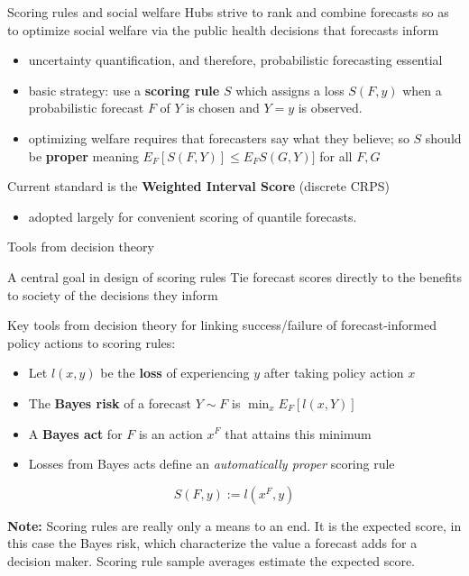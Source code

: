 \documentclass[
  9pt,
  ignorenonframetext,
]{beamer}
\providecommand{\tightlist}{%
  \setlength{\itemsep}{0pt}\setlength{\parskip}{0pt}}\usepackage{longtable,booktabs,array}
\begin{document}
\begin{frame}{Scoring rules and social welfare}
\protect\hypertarget{scoring-rules-and-social-welfare}{}
Hubs strive to rank and combine forecasts so as to optimize social
welfare via the public health decisions that forecasts inform

\begin{itemize}
\item
  uncertainty quantification, and therefore, probabilistic forecasting
  essential
\item
  basic strategy: use a \textbf{scoring rule} \(S\) which assigns a loss
  \(S(F,y)\) when a probabilistic forecast \(F\) of \(Y\) is chosen and
  \(Y=y\) is observed.
\item
  optimizing welfare requires that forecasters say what they believe; so
  \(S\) should be \textbf{proper} meaning
  \(\displaystyle{E_{F}[S(F,Y)] \leq E_{F}S(G,Y)]}\) for all \(F, G\)
\end{itemize}

Current standard is the \textbf{Weighted Interval Score} (discrete CRPS)

\begin{itemize}
\tightlist
\item
  adopted largely for convenient scoring of quantile forecasts.
\end{itemize}
\end{frame}

\begin{frame}{Tools from decision theory}
\protect\hypertarget{tools-from-decision-theory}{}
\begin{block}{A central goal in design of scoring rules}
\protect\hypertarget{a-central-goal-in-design-of-scoring-rules}{}
Tie forecast scores directly to the benefits to society of the decisions
they inform

Key tools from decision theory for linking success/failure of
forecast-informed policy actions to scoring rules:

\begin{itemize}
\item
  Let \(l(x,y)\) be the \textbf{loss} of experiencing \(y\) after taking
  policy action \(x\)
\item
  The \textbf{Bayes risk} of a forecast \(Y \sim F\) is
  \(\min_x E_F[l(x,Y)]\)
\item
  A \textbf{Bayes act} for \(F\) is an action \(x^F\) that attains this
  minimum
\item
  Losses from Bayes acts define an \emph{automatically proper} scoring
  rule
\end{itemize}

\[
S(F,y) := l(x^F, y)
\]

\textbf{Note:} Scoring rules are really only a means to an end. It is
the expected score, in this case the Bayes risk, which characterize the
value a forecast adds for a decision maker. Scoring rule sample averages
estimate the expected score.
\end{block}
\end{frame}
\end{document}
